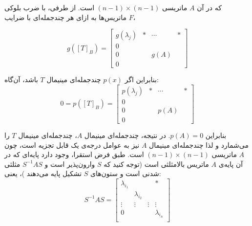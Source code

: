 که در آن $A$ ماتریسی
$(n-1)\times (n-1)$
است. از طرفی، با ضرب بلوکی ماتریس‌ها به ازای هر چندجمله‌ای با ضرایب $F$،

$$g([T]_B) = \begin{bmatrix}
g(\lambda_j) & * & \cdots & * \\
0 & \; & \; & \; \\
0 & \; & g(A) & \; \\
0 & \; & \; & \;
\end{bmatrix}$$

بنابراین اگر $p(x)$ چندجمله‌ای مینیمال $T$ باشد، آن‌گاه:
$$0=p([T]_B) = \begin{bmatrix}
p(\lambda_j) & * & \cdots & * \\
0 & \; & \; & \; \\
0 & \; & p(A) & \; \\
0 & \; & \; & \;
\end{bmatrix}$$

بنابراین $p(A)=0$. در نتیجه، چندجمله‌ای مینیمال $A$، چندجمله‌ای مینیمال $T$ را می‌شمارد و لذا چندجمله‌ای مینیمال $A$ نیز به عوامل درجه‌ی یک قابل تجزیه است، چون $A$ ماتریسی
$(n-1)\times (n-1)$
است. طبق فرض استقرا، وجود دارد پایه‌ای که در آن پایه‌ی $A$ ماتریس بالامثلثی است (توجه کنید که $S$ وارون‌پذیر است و
$S^{-1}AS$
مثلثی شدنی است و ستون‌های $S$ تشکیل پایه می‌دهند
)، یعنی:
$$S^{-1}AS = \begin{bmatrix}
\lambda_{i_1} & \; & \; & * \\
\; & \lambda_{i_2} & \; & \; \\
\vdots & \vdots & \vdots & \vdots \\
0 & \; & \; & \lambda_{i_n} \\
\end{bmatrix}$$

